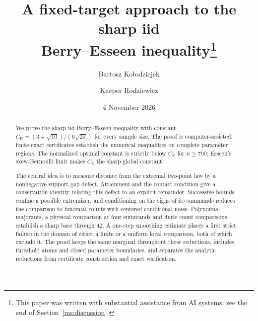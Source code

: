\documentclass[11pt,a4paper]{article}
\title{A fixed-target approach to the sharp iid\\
Berry--Esseen inequality\thanks{This paper was written with substantial
assistance from AI systems; see the end of Section~\ref{ms:discussion}.}}
\author{Bartosz Ko{\l}odziejek \and Kacper Rodziewicz}
\date{4 November 2026}
\theoremstyle{definition}
\theoremstyle{remark}
\newcommand{\CE}{C_{\mathrm E}}
\begin{document}
\maketitle
\begin{abstract}
We prove the sharp iid Berry--Esseen inequality with constant
$\CE=(3+\sqrt{10})/(6\sqrt{2\pi})$ for every sample size.
The proof is computer-assisted: finite exact certificates establish
the numerical inequalities on complete parameter regions. The
normalized optimal constant is strictly below $\CE$ for $n\ge700$;
Esseen's skew-Bernoulli limit makes $\CE$ the sharp global constant.

The central idea is to measure distance from the extremal two-point
law by a nonnegative support-gap defect. Attainment and the contact
condition give a conservation identity relating this defect to an
explicit remainder. Successive bounds confine a possible extremizer,
and conditioning on the signs of its summands reduces the comparison
to binomial counts with centered conditional noise. Polynomial
majorants, a physical comparison at four summands and finite count
comparisons establish a sharp base through $42$.
A one-step smoothing estimate places a first strict failure
in the domain of either a finite or a uniform local comparison, both
of which exclude it. The proof keeps the same marginal throughout
these reductions, includes threshold atoms and closed parameter
boundaries, and separates the analytic reductions from certificate
construction and exact verification.
\end{abstract}
\begingroup\small
\makeatletter
\renewcommand{\l@section}{\@dottedtocline{1}{0em}{1.5em}}
\makeatother
\tableofcontents
\endgroup
\clearpage




















\appendix
\renewcommand{\thesection}{\AlphAlph{\value{section}}}
\renewcommand{\theHsection}{appendix.\arabic{section}}


\end{document}

